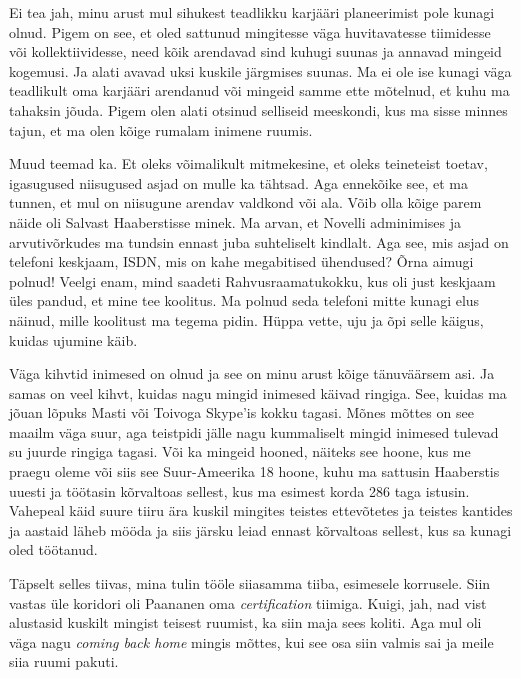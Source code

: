 
Ei tea jah, minu arust mul sihukest teadlikku karjääri planeerimist pole kunagi 
olnud. Pigem on see, et oled sattunud mingitesse väga huvitavatesse tiimidesse 
või kollektiividesse, need kõik arendavad sind kuhugi suunas ja annavad  
mingeid kogemusi. Ja alati avavad uksi kuskile järgmises suunas. Ma ei ole ise 
kunagi  väga teadlikult oma karjääri arendanud või mingeid samme ette mõtelnud, 
et kuhu ma tahaksin jõuda. Pigem olen alati otsinud selliseid meeskondi, kus ma 
sisse minnes tajun, et ma olen kõige rumalam inimene ruumis. 


Muud teemad ka. Et oleks võimalikult mitmekesine, et oleks teineteist toetav, 
igasugused niisugused asjad on mulle ka tähtsad. Aga ennekõike see, et ma 
tunnen, et mul on niisugune arendav valdkond või ala. Võib olla kõige parem 
näide oli Salvast Haaberstisse minek. Ma arvan, et Novelli adminimises ja 
arvutivõrkudes ma tundsin ennast juba suhteliselt kindlalt. Aga see, mis asjad 
on telefoni keskjaam, ISDN, mis on kahe megabitised ühendused? Õrna aimugi 
polnud! Veelgi enam, mind saadeti Rahvusraamatukokku, kus oli just keskjaam 
üles pandud, et mine tee koolitus. Ma polnud seda telefoni mitte kunagi elus 
näinud, mille koolitust ma tegema pidin. Hüppa vette, uju ja õpi selle käigus, 
 kuidas ujumine käib. 

Väga kihvtid inimesed on olnud ja see on minu arust kõige tänuväärsem asi. Ja 
samas on veel kihvt, kuidas nagu mingid inimesed käivad ringiga. See, kuidas ma 
jõuan lõpuks Masti või Toivoga 
Skype'is kokku tagasi. Mõnes mõttes on see maailm väga suur, aga  teistpidi 
jälle nagu kummaliselt mingid inimesed tulevad su juurde  ringiga tagasi. Või 
ka mingeid hooned, näiteks see hoone, kus me praegu oleme või siis see Suur-Ameerika 18 hoone, kuhu ma sattusin  
Haaberstis uuesti ja töötasin kõrvaltoas sellest, kus ma esimest korda  
286 taga istusin. Vahepeal käid suure tiiru ära kuskil mingites teistes ettevõtetes ja 
teistes kantides ja aastaid läheb mööda ja siis järsku leiad ennast kõrvaltoas 
sellest, kus sa kunagi oled töötanud. 


Täpselt selles tiivas, mina tulin tööle siiasamma tiiba, esimesele korrusele. 
Siin vastas üle koridori oli Paananen oma 
\emph{certification} tiimiga. Kuigi, jah, nad vist alustasid kuskilt mingist 
teisest ruumist, ka siin maja sees koliti. Aga mul oli väga nagu \emph{coming 
back home} mingis mõttes, kui see osa siin valmis sai ja meile siia ruumi 
pakuti. 